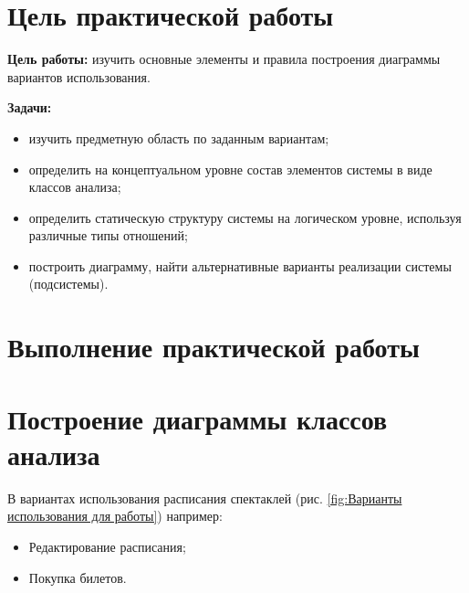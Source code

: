 \graphicspath{{./SecondTask/}} %

\section*{\LARGE Цель практической работы}

\textbf{Цель работы:} изучить основные элементы и правила построения диаграммы
вариантов использования.

\textbf{Задачи:}\par
\begin{itemize}
	\item изучить предметную область по заданным вариантам;
	\item определить на концептуальном уровне состав элементов системы в
	виде классов анализа;
	\item определить статическую структуру системы на логическом уровне,
	используя различные типы отношений;
	\item построить диаграмму, найти альтернативные варианты реализации
	системы (подсистемы).
\end{itemize}

\newpage

\section*{\LARGE Выполнение практической работы}
\section{Построение диаграммы классов анализа}
В вариантах использования расписания спектаклей (рис. \ref{fig:Варианты использования для работы}) например:
\begin{itemize}
	\item Редактирование расписания;
	\item Покупка билетов.
\end{itemize}


